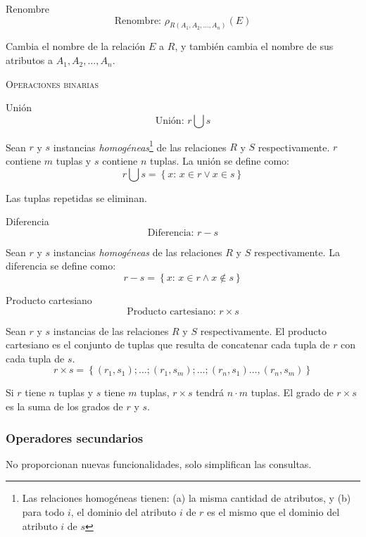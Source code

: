 \documentclass[a4paper, twoside]{article}
\begin{document}
		
\begin{definicion}[0.9\textwidth]{Renombre}
	\[
		\text{Renombre: } \rho_{R(A_{1},A_{2},\dots,A_{n})}(E)
	\]

	Cambia el nombre de la relación $E$ a $R$, y también cambia el nombre de sus atributos a $A_{1}, A_{2}, \dots, A_{n}$.
\end{definicion}

\newpage
{\Large \textsc{Operaciones binarias}}\\

\begin{definicion}[0.9\textwidth]{Unión}
	\[
		\text{Unión: } r \bigcup s
	\]

	Sean $r$ y $s$ instancias \emph{homogéneas}\footnote{Las relaciones homogéneas tienen: (a) la misma cantidad de atributos, y (b) para todo $i$, el dominio del atributo $i$ de $r$ es el mismo que el dominio del atributo $i$ de $s$} de las relaciones $R$ y $S$ respectivamente. $r$ contiene $m$ tuplas y $s$ contiene $n$ tuplas. La unión se define como:
	\[
		r \bigcup s = \left\{ x:\, x\in r\vee x\in s\right\} 
	\]

	Las tuplas repetidas se eliminan.
\end{definicion}

\begin{definicion}[0.9\textwidth]{Diferencia}
	\[
		\text{Diferencia: } r-s
	\]

	Sean $r$ y $s$ instancias \emph{homogéneas }de las relaciones $R$ y $S$ respectivamente. La diferencia se define como:
	\[
		r-s=\left\{ x:\, x\in r\wedge x\not\in s\right\} 
	\]
\end{definicion}

\begin{definicion}[0.9\textwidth]{Producto cartesiano}
	\[
		\text{Producto cartesiano: } r \times s
	\] 

	Sean $r$ y $s$ instancias de las relaciones $R$ y $S$ respectivamente. El producto cartesiano es el conjunto de tuplas que resulta de concatenar cada tupla de $r$ con cada tupla de $s$.
	\[
		r\times s = \left\{ \left( r_{1}, s_{1} \right); \ldots; \left( r_{1}, s_{m} \right); \ldots;\left( r_{n}, s_{1} \right) \ldots, \left( r_{n}, s_{m} \right) \right\}
	\]

	Si $r$ tiene $n$ tuplas y $s$ tiene $m$ tuplas, $r\times s$ tendrá $n\cdot m$ tuplas. El grado de $r\times s$ es la suma de los grados de $r$ y $s$.
\end{definicion}

\subsubsection{Operadores secundarios}
No proporcionan nuevas funcionalidades, solo simplifican las consultas.
\end{document}
